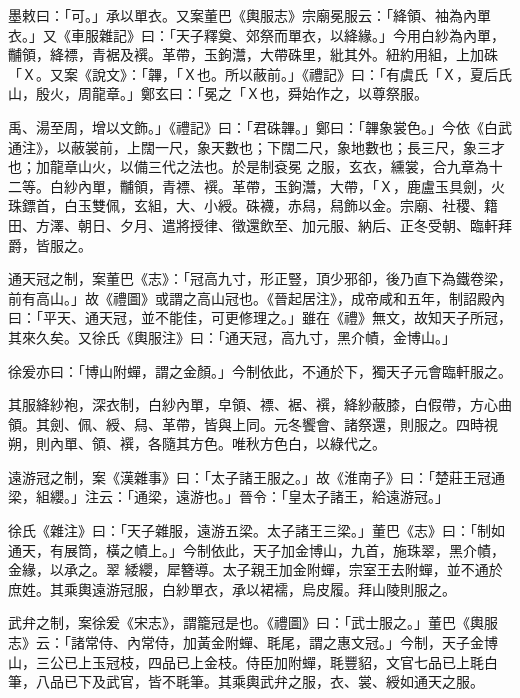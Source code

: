 \begin{pinyinscope}
 墨敕曰：「可。」承以單衣。又案董巴《輿服志》宗廟冕服云：「絳領、袖為內單衣。」又《車服雜記》曰：「天子釋奠、郊祭而單衣，以絳緣。」今用白紗為內單，黼領，絳褾，青裾及襈。革帶，玉鉤灊，大帶硃里，紕其外。紐約用組，上加硃「Ｘ。又案《說文》：「韠，「Ｘ也。所以蔽前。」《禮記》曰：「有虞氏「Ｘ，夏后氏山，殷火，周龍章。」鄭玄曰：「冕之「Ｘ也，舜始作之，以尊祭服。



 禹、湯至周，增以文飾。」《禮記》曰：「君硃韠。」鄭曰：「韠象裳色。」今依《白武通注》，以蔽裳前，上闊一尺，象天數也；下闊二尺，象地數也；長三尺，象三才也；加龍章山火，以備三代之法也。於是制袞冕
 之服，玄衣，纁裳，合九章為十二等。白紗內單，黼領，青褾、襈。革帶，玉鉤灊，大帶，「Ｘ，鹿盧玉具劍，火珠鏢首，白玉雙佩，玄組，大、小綬。硃襪，赤舄，舄飾以金。宗廟、社稷、籍田、方澤、朝日、夕月、遣將授律、徵還飲至、加元服、納后、正冬受朝、臨軒拜爵，皆服之。



 通天冠之制，案董巴《志》：「冠高九寸，形正豎，頂少邪卻，後乃直下為鐵卷梁，前有高山。」故《禮圖》或謂之高山冠也。《晉起居注》，成帝咸和五年，制詔殿內曰：「平天、通天冠，並不能佳，可更修理之。」雖在《禮》無文，故知天子所冠，其來久矣。又徐氏《輿服注》曰：「通天冠，高九寸，黑介幘，金博山。」



 徐爰亦曰：「博山附蟬，謂之金顏。」今制依此，不通於下，獨天子元會臨軒服之。



 其服絳紗袍，深衣制，白紗內單，皁領、褾、裾、襈，絳紗蔽膝，白假帶，方心曲領。其劍、佩、綬、舄、革帶，皆與上同。元冬饗會、諸祭還，則服之。四時視朔，則內單、領、襈，各隨其方色。唯秋方色白，以綠代之。



 遠游冠之制，案《漢雜事》曰：「太子諸王服之。」故《淮南子》曰：「楚莊王冠通梁，組纓。」注云：「通梁，遠游也。」晉令：「皇太子諸王，給遠游冠。」



 徐氏《雜注》曰：「天子雜服，遠游五梁。太子諸王三梁。」董巴《志》曰：「制如通天，有展筒，橫之幘上。」今制依此，天子加金博山，九首，施珠翠，黑介幘，金緣，以承之。翠
 緌纓，犀簪導。太子親王加金附蟬，宗室王去附蟬，並不通於庶姓。其乘輿遠游冠服，白紗單衣，承以裙襦，烏皮履。拜山陵則服之。



 武弁之制，案徐爰《宋志》，謂籠冠是也。《禮圖》曰：「武士服之。」董巴《輿服志》云：「諸常侍、內常侍，加黃金附蟬、毦尾，謂之惠文冠。」今制，天子金博山，三公已上玉冠枝，四品已上金枝。侍臣加附蟬，毦豐貂，文官七品已上毦白筆，八品已下及武官，皆不毦筆。其乘輿武弁之服，衣、裳、綬如通天之服。




\end{pinyinscope}
